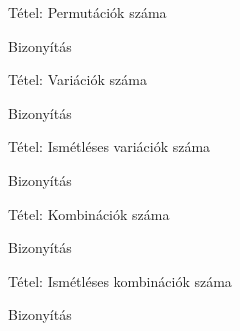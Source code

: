 \documentclass{beamer}
\begin{document}
\begin{frame}

\begin{block}{Tétel: Permutációk száma}
\end{block}

\begin{block}{Bizonyítás}
\end{block}

\end{frame}

\begin{frame}

\begin{block}{Tétel: Variációk száma}
\end{block}

\begin{block}{Bizonyítás}
\end{block}

\end{frame}

\begin{frame}

\begin{block}{Tétel: Ismétléses variációk száma}
\end{block}

\begin{block}{Bizonyítás}
\end{block}

\end{frame}

\begin{frame}

\begin{block}{Tétel: Kombinációk száma}
\end{block}

\begin{block}{Bizonyítás}
\end{block}

\end{frame}

\begin{frame}

\begin{block}{Tétel: Ismétléses kombinációk száma}
\end{block}

\begin{block}{Bizonyítás}
\end{block}

\end{frame}
\end{document}
